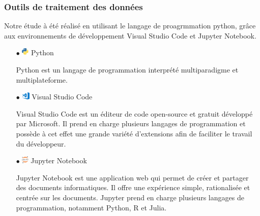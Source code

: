 \subsubsection{Outils de traitement des données}
\par{
Notre étude à été réalisé en utilisant le langage de proagrmmation python, grâce aux environnements 
de développement Visual Studio Code et Jupyter Notebook.}

\begin{itemize}
	\item[$\bullet$] \includegraphics[height=1em]{icons/python-icon.jpg} Python
	\par{Python est un langage de programmation interprété multiparadigme et multiplateforme.}

	\item[$\bullet$] \includegraphics[height=1em]{icons/vscode-icon.png} Visual Studio Code
	\par{Visual Studio Code est un éditeur de code open-source et gratuit développé 
		par Microsoft. Il prend en charge plusieurs langages de programmation et 
		possède à cet effet une grande variété d'extensions afin de faciliter le 
		travail du développeur.}

	\item[$\bullet$] \includegraphics[height=1em]{icons/jupyter-icon.png} Jupyter Notebook
	\par{
		Jupyter Notebook est une application web qui permet de créer et partager 
		des documents informatiques. Il offre une expérience simple, rationalisée 
		et centrée sur les documents. Jupyter prend en charge plusieurs langages 
		de programmation, notamment Python, R et Julia.}

\end{itemize}

